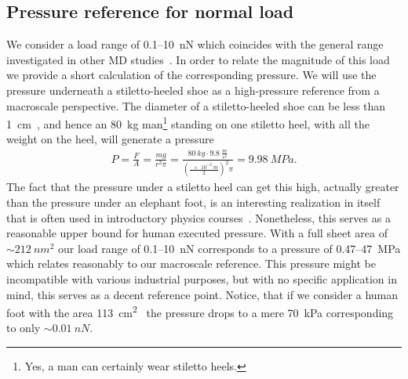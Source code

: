 \subsection{Pressure reference for normal load}
We consider a load range of 0.1--\SI{10}{nN} which coincides with the general range investigated in other \acrshort{MD} studies~\cite{li_evolving_2016, zhu_study_2018, zhu_study_2018}. In order to relate the magnitude of this load we provide a short calculation of the corresponding pressure. We will use the pressure underneath a stiletto-heeled shoe as a high-pressure reference from a macroscale perspective. The diameter of a stiletto-heeled
shoe can be less than \SI{1}{cm}~\cite{stiletto_1}, and hence an \SI{80}{kg} man\footnote{Yes, a man can certainly
wear stiletto heels.} standing on one stiletto heel, with all the weight on the heel, will generate a pressure
\begin{align*}
  P = \frac{F}{A} = \frac{mg}{r^2\pi} = \frac{\SI{80}{kg} \cdot \SI{9.8}{\frac{m}{s^2}}}{{(\frac{\SI{e-2}{m}}{2})}^2 \pi} = \SI{9.98}{MPa}.
\end{align*} 
The fact that the pressure under a stiletto heel can get this high, actually greater than the pressure under an elephant foot, is an interesting realization in itself that is often used in
introductory physics courses~\cite{stiletto_2}. Nonetheless, this serves as a reasonable upper bound for human executed pressure. With
a full sheet area of $\sim \SI{212}{nm^2}$ our load range of 0.1--\SI{10}{nN} corresponds to a pressure of 0.47--\SI{47}{MPa} which relates reasonably to our macroscale reference. This pressure might be incompatible with various industrial purposes, but with no specific application in mind, this serves as a decent reference point. Notice, that if we consider a human foot with the area \SI{113}{cm^2}~\cite{stiletto_3} the pressure drops to a mere \SI{70}{kPa} corresponding to only $\sim \SI{0.01}{nN}$.


